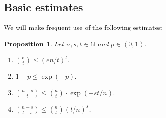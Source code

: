 \documentclass[reqno,final,a4paper]{amsart}
\numberwithin{equation}{section}
\newtheorem{proposition}[theorem]{Proposition}
\theoremstyle{definition}
\theoremstyle{remark}
\newcommand{\N}{\mathbb{N}}
\begin{document}
\subsection{Basic estimates}
We will make frequent use of the following estimates:
\begin{proposition}\label{prop:estimates}
    Let $n,s,t\in \N$ and $p \in (0,1)$.
    \begin{enumerate}
        \item $\binom{n}{t}\leq (en/t)^t$.
        \item $1-p\leq \exp(-p)$.
        \item $\binom{n-s}{t}\leq \binom{n}{t}\cdot \exp(-st/n)$.
        \item $\binom{n-s}{t-s}\leq \binom{n}{t}(t/n)^s$.
    \end{enumerate}
\end{proposition}
\end{document}
